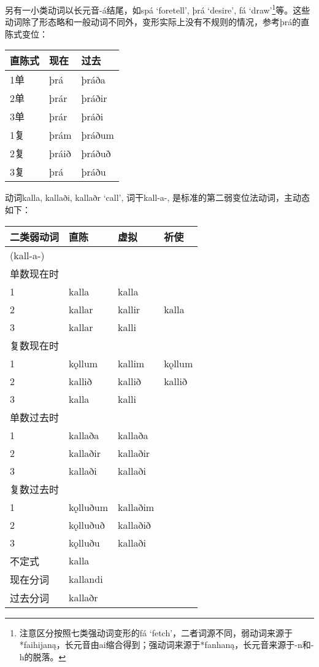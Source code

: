 另有一小类动词以长元音-á结尾，如spá `foretell', þrá `desire', fá
`draw'\footnote{注意区分按照七类强动词变形的fá
  `fetch'，二者词源不同，弱动词来源于*faihijaną，长元音由ai缩合得到；强动词来源于*fanhaną，长元音来源于-n和-h的脱落。}等。这些动词除了形态略和一般动词不同外，变形实际上没有不规则的情况，参考þrá的直陈式变位：

\begin{longtable}{lll}
  \toprule
  直陈式 & 现在  & 过去   \\
  \midrule
  \endhead
  \bottomrule
  \endfoot
  1单    & þrá   & þráða  \\
  2单    & þrár  & þráðir \\
  3单    & þrár  & þráði  \\
  1复    & þrám  & þráðum \\
  2复    & þráið & þráðuð \\
  3复    & þrá   & þráðu  \\
\end{longtable}

动词kalla, kallaði, kallaðr `call‌', 词干kall-a-,
是标准的第二弱变位法动词，主动态如下：

\begin{longtable}{llll}
  \toprule
  二类弱动词 & 直陈     & 虚拟     & 祈使   \\
  \midrule
  \endhead
  \bottomrule
  \endfoot
  (kall-a-)  &          &          &        \\
  单数现在时 &          &          &        \\
  1          & kalla    & kalla    &        \\
  2          & kallar   & kallir   & kalla  \\
  3          & kallar   & kalli    &        \\
  复数现在时 &          &          &        \\
  1          & kǫllum   & kallim   & kǫllum \\
  2          & kallið   & kallið   & kallið \\
  3          & kalla    & kalli    &        \\
  单数过去时 &          &          &        \\
  1          & kallaða  & kallaða  &        \\
  2          & kallaðir & kallaðir &        \\
  3          & kallaði  & kallaði  &        \\
  复数过去时 &          &          &        \\
  1          & kǫlluðum & kallaðim &        \\
  2          & kǫlluðuð & kallaðið &        \\
  3          & kǫlluðu  & kallaði  &        \\
  不定式     & kalla    &          &        \\
  现在分词   & kallandi &          &        \\
  过去分词   & kallaðr  &          &        \\
\end{longtable}

